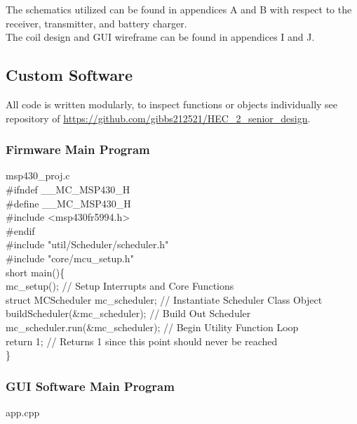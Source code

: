 \documentclass[12pt]{article}
\begin{document}
\noindent
The schematics utilized can be found in appendices A and B with respect to the receiver, transmitter, and battery charger.\\

\noindent
The coil design and GUI wireframe can be found in appendices I and J.

\subsection{Custom Software}

\indent
All code is written modularly, to inspect functions or objects individually see repository of \url{https://github.com/gibbs212521/HEC\_2\_senior\_design}. \\

\subsubsection{Firmware Main Program} msp430\_proj.c\\

{\ttfamily
\noindent
\#ifndef \_\_MC\_MSP430\_H\\
\#define \_\_MC\_MSP430\_H\\
\#include <msp430fr5994.h>\\
\#endif\\
\#include "util/Scheduler/scheduler.h"\\
\#include "core/mcu\_setup.h"\\
short main()\{\\
\indent mc\_setup();				// Setup Interrupts and Core Functions\\
\indent struct MCScheduler mc\_scheduler;	// Instantiate Scheduler Class Object\\
\indent buildScheduler(\&mc\_scheduler);	// Build Out Scheduler\\
\indent mc\_scheduler.run(\&mc\_scheduler);	// Begin Utility Function Loop\\
\indent return 1;		// Returns 1 since this point should never be reached\\
\}\\
}
\pagebreak

\subsubsection{GUI Software Main Program} app.cpp\\
\end{document}
